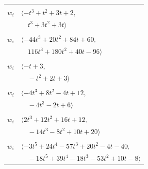 \documentclass[11pt]{article}
\begin{document}
\begin{longtable}{@{}ll@{}}
\addlinespace[2pt]
\multicolumn{2}{@{}p{0.97\textwidth}@{}}{$i=17$, $D_i=1$, $\rho_{ij}$: $0{:}1, \allowbreak 1{:}2, \allowbreak 18{:}2, \allowbreak 19{:}2, \allowbreak 20{:}1, \allowbreak 22{:}2$}\\
$w_i$ & $\langle -t^{3}+t^{2}+3t+2,$\\
 & $\quad t^{3}+3t^{2}+3t\rangle$\\
\addlinespace[2pt]
\multicolumn{2}{@{}p{0.97\textwidth}@{}}{$i=18$, $D_i=1$, $\rho_{ij}$: $1{:}2, \allowbreak 2{:}2, \allowbreak 5{:}2, \allowbreak 10{:}1, \allowbreak 13{:}1, \allowbreak 15{:}2, \allowbreak 16{:}2, \allowbreak 17{:}1, \allowbreak 24{:}1, \allowbreak 26{:}1, \allowbreak 32{:}2, \allowbreak 33{:}1$}\\
$w_i$ & $\langle -44t^{3}+20t^{2}+84t+60,$\\
 & $\quad 116t^{3}+180t^{2}+40t-96\rangle$\\
\addlinespace[2pt]
\multicolumn{2}{@{}p{0.97\textwidth}@{}}{$i=19$, $D_i=1$, $\rho_{ij}$: $1{:}1, \allowbreak 12{:}1, \allowbreak 15{:}1, \allowbreak 17{:}1, \allowbreak 22{:}1, \allowbreak 25{:}2, \allowbreak 26{:}1$}\\
$w_i$ & $\langle -t+3,$\\
 & $\quad -t^{2}+2t+3\rangle$\\
\addlinespace[2pt]
\multicolumn{2}{@{}p{0.97\textwidth}@{}}{$i=20$, $D_i=1$, $\rho_{ij}$: $10{:}1, \allowbreak 11{:}2, \allowbreak 17{:}2, \allowbreak 23{:}2, \allowbreak 24{:}2, \allowbreak 29{:}2, \allowbreak 32{:}1$}\\
$w_i$ & $\langle -4t^{3}+8t^{2}-4t+12,$\\
 & $\quad -4t^{3}-2t+6\rangle$\\
\addlinespace[2pt]
\multicolumn{2}{@{}p{0.97\textwidth}@{}}{$i=21$, $D_i=1$, $\rho_{ij}$: $8{:}2, \allowbreak 10{:}1, \allowbreak 12{:}2, \allowbreak 24{:}2, \allowbreak 26{:}2, \allowbreak 30{:}1$}\\
$w_i$ & $\langle 2t^{3}+12t^{2}+16t+12,$\\
 & $\quad -14t^{3}-8t^{2}+10t+20\rangle$\\
\addlinespace[2pt]
\multicolumn{2}{@{}p{0.97\textwidth}@{}}{$i=22$, $D_i=1$, $\rho_{ij}$: $2{:}1, \allowbreak 6{:}2, \allowbreak 7{:}1, \allowbreak 11{:}2, \allowbreak 13{:}2, \allowbreak 14{:}1, \allowbreak 17{:}1, \allowbreak 19{:}2, \allowbreak 28{:}2, \allowbreak 30{:}1$}\\
$w_i$ & $\langle -3t^{5}+24t^{4}-57t^{3}+20t^{2}-4t-40,$\\
 & $\quad -18t^{5}+39t^{4}-18t^{3}-53t^{2}+10t-8\rangle$\\

\end{longtable}
\end{document}
